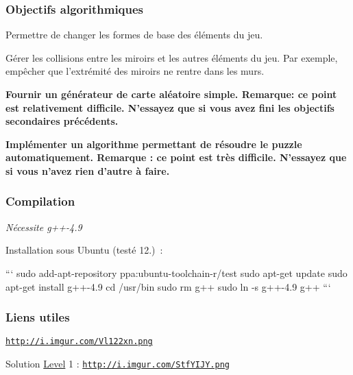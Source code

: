 \subsubsection*{Objectifs algorithmiques}


\begin{DoxyItemize}
\item Permettre de changer les formes de base des éléments du jeu.
\item Gérer les collisions entre les miroirs et les autres éléments du jeu. Par exemple, empêcher que l'extrémité des miroirs ne rentre dans les murs.
\item {\bfseries Fournir un générateur de carte aléatoire simple. Remarque\+: ce point est relativement difficile. N'essayez que si vous avez fini les objectifs secondaires précédents.}
\item {\bfseries Implémenter un algorithme permettant de résoudre le puzzle automatiquement. Remarque \+: ce point est très difficile. N'essayez que si vous n'avez rien d'autre à faire.}
\end{DoxyItemize}

\subsubsection*{Compilation}

{\itshape Nécessite g++-\/4.9}

Installation sous Ubuntu (testé 12.) \+:

``` sudo add-\/apt-\/repository ppa\+:ubuntu-\/toolchain-\/r/test sudo apt-\/get update sudo apt-\/get install g++-\/4.9 cd /usr/bin sudo rm g++ sudo ln -\/s g++-\/4.9 g++ ```

\subsubsection*{Liens utiles}


\begin{DoxyItemize}
\item \href{http://i.imgur.com/Vl122xn.png}{\tt http\+://i.\+imgur.\+com/\+Vl122xn.\+png}
\item Solution \hyperlink{classLevel}{Level} 1 \+: \href{http://i.imgur.com/StfYIJY.png}{\tt http\+://i.\+imgur.\+com/\+Stf\+Y\+I\+J\+Y.\+png} 
\end{DoxyItemize}